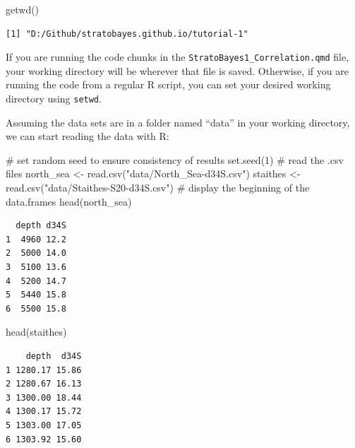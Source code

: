 \documentclass[
  letterpaper,
  DIV=11,
  numbers=noendperiod]{scrartcl}
\newenvironment{Shaded}{\begin{snugshade}}{\end{snugshade}}
\newcommand{\CommentTok}[1]{\textcolor[rgb]{0.37,0.37,0.37}{#1}}
\newcommand{\DecValTok}[1]{\textcolor[rgb]{0.68,0.00,0.00}{#1}}
\newcommand{\FunctionTok}[1]{\textcolor[rgb]{0.28,0.35,0.67}{#1}}
\newcommand{\NormalTok}[1]{\textcolor[rgb]{0.00,0.23,0.31}{#1}}
\newcommand{\OtherTok}[1]{\textcolor[rgb]{0.00,0.23,0.31}{#1}}
\newcommand{\StringTok}[1]{\textcolor[rgb]{0.13,0.47,0.30}{#1}}
\begin{document}
\begin{Shaded}
\begin{Highlighting}[]
\FunctionTok{getwd}\NormalTok{()}
\end{Highlighting}
\end{Shaded}

\begin{verbatim}
[1] "D:/Github/stratobayes.github.io/tutorial-1"
\end{verbatim}

If you are running the code chunks in the
\texttt{StratoBayes1\_Correlation.qmd} file, your working directory will
be wherever that file is saved. Otherwise, if you are running the code
from a regular R script, you can set your desired working directory
using \texttt{setwd}.

Assuming the data sets are in a folder named ``data'' in your working
directory, we can start reading the data with R:

\begin{Shaded}
\begin{Highlighting}[]
\CommentTok{\# set random seed to ensure consistency of results}
\FunctionTok{set.seed}\NormalTok{(}\DecValTok{1}\NormalTok{)}
\CommentTok{\# read the .csv files}
\NormalTok{north\_sea }\OtherTok{\textless{}{-}} \FunctionTok{read.csv}\NormalTok{(}\StringTok{"data/North\_Sea{-}d34S.csv"}\NormalTok{)}
\NormalTok{staithes }\OtherTok{\textless{}{-}} \FunctionTok{read.csv}\NormalTok{(}\StringTok{"data/Staithes{-}S20{-}d34S.csv"}\NormalTok{)}
\CommentTok{\# display the beginning of the data.frames}
\FunctionTok{head}\NormalTok{(north\_sea)}
\end{Highlighting}
\end{Shaded}

\begin{verbatim}
  depth d34S
1  4960 12.2
2  5000 14.0
3  5100 13.6
4  5200 14.7
5  5440 15.8
6  5500 15.8
\end{verbatim}

\begin{Shaded}
\begin{Highlighting}[]
\FunctionTok{head}\NormalTok{(staithes)}
\end{Highlighting}
\end{Shaded}

\begin{verbatim}
    depth  d34S
1 1280.17 15.86
2 1280.67 16.13
3 1300.00 18.44
4 1300.17 15.72
5 1303.00 17.05
6 1303.92 15.60
\end{verbatim}
\end{document}
